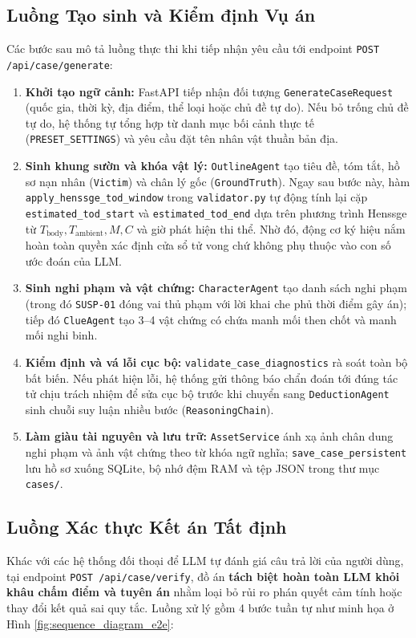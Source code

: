 \subsection{Luồng Tạo sinh và Kiểm định Vụ án}
Các bước sau mô tả luồng thực thi khi tiếp nhận yêu cầu tới endpoint \texttt{POST /api/case/generate}:
\begin{enumerate}[leftmargin=1.5cm]
    \item \textbf{Khởi tạo ngữ cảnh:} FastAPI tiếp nhận đối tượng \texttt{GenerateCaseRequest} (quốc gia, thời kỳ, địa điểm, thể loại hoặc chủ đề tự do). Nếu bỏ trống chủ đề tự do, hệ thống tự tổng hợp từ danh mục bối cảnh thực tế (\texttt{PRESET\_SETTINGS}) và yêu cầu đặt tên nhân vật thuần bản địa.
    \item \textbf{Sinh khung sườn và khóa vật lý:} \texttt{OutlineAgent} tạo tiêu đề, tóm tắt, hồ sơ nạn nhân (\texttt{Victim}) và chân lý gốc (\texttt{GroundTruth}). Ngay sau bước này, hàm \texttt{apply\_henssge\_tod\_window} trong \texttt{validator.py} tự động tính lại cặp \texttt{estimated\_tod\_start} và \texttt{estimated\_tod\_end} dựa trên phương trình Henssge từ $T_{\text{body}}, T_{\text{ambient}}, M, C$ và giờ phát hiện thi thể. Nhờ đó, động cơ ký hiệu nắm hoàn toàn quyền xác định cửa sổ tử vong chứ không phụ thuộc vào con số ước đoán của LLM.
    \item \textbf{Sinh nghi phạm và vật chứng:} \texttt{CharacterAgent} tạo danh sách nghi phạm (trong đó \texttt{SUSP-01} đóng vai thủ phạm với lời khai che phủ thời điểm gây án); tiếp đó \texttt{ClueAgent} tạo 3--4 vật chứng có chứa manh mối then chốt và manh mối nghi binh.
    \item \textbf{Kiểm định và vá lỗi cục bộ:} \texttt{validate\_case\_diagnostics} rà soát toàn bộ bất biến. Nếu phát hiện lỗi, hệ thống gửi thông báo chẩn đoán tới đúng tác tử chịu trách nhiệm để sửa cục bộ trước khi chuyển sang \texttt{DeductionAgent} sinh chuỗi suy luận nhiều bước (\texttt{ReasoningChain}).
    \item \textbf{Làm giàu tài nguyên và lưu trữ:} \texttt{AssetService} ánh xạ ảnh chân dung nghi phạm và ảnh vật chứng theo từ khóa ngữ nghĩa; \texttt{save\_case\_persistent} lưu hồ sơ xuống SQLite, bộ nhớ đệm RAM và tệp JSON trong thư mục \texttt{cases/}.
\end{enumerate}

\subsection{Luồng Xác thực Kết án Tất định}
Khác với các hệ thống đối thoại để LLM tự đánh giá câu trả lời của người dùng, tại endpoint \texttt{POST /api/case/verify}, đồ án \textbf{tách biệt hoàn toàn LLM khỏi khâu chấm điểm và tuyên án} nhằm loại bỏ rủi ro phán quyết cảm tính hoặc thay đổi kết quả sai quy tắc. Luồng xử lý gồm 4 bước tuần tự như minh họa ở Hình \ref{fig:sequence_diagram_e2e}:


